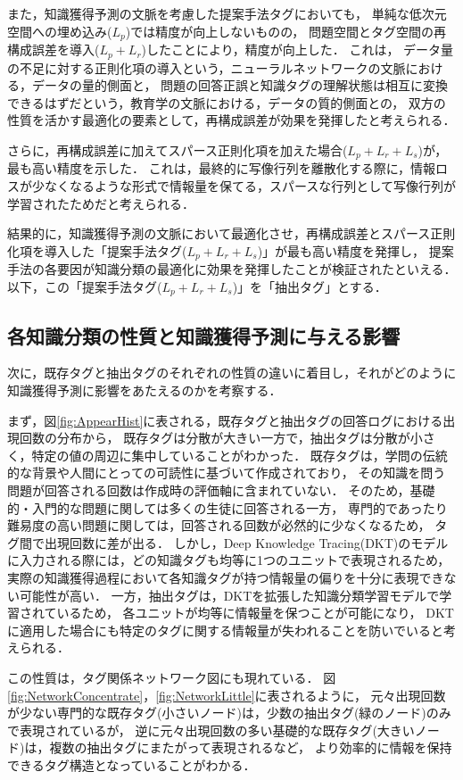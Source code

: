 また，知識獲得予測の文脈を考慮した提案手法タグにおいても，
単純な低次元空間への埋め込み($L_p$)では精度が向上しないものの，
問題空間とタグ空間の再構成誤差を導入($L_p + L_r$)したことにより，精度が向上した．
これは，
データ量の不足に対する正則化項の導入という，ニューラルネットワークの文脈における，データの量的側面と，
問題の回答正誤と知識タグの理解状態は相互に変換できるはずだという，教育学の文脈における，データの質的側面との，
双方の性質を活かす最適化の要素として，再構成誤差が効果を発揮したと考えられる．

さらに，再構成誤差に加えてスパース正則化項を加えた場合($L_p + L_r + L_s$)が，最も高い精度を示した．
これは，最終的に写像行列を離散化する際に，情報ロスが少なくなるような形式で情報量を保てる，スパースな行列として写像行列が学習されたためだと考えられる．

結果的に，知識獲得予測の文脈において最適化させ，再構成誤差とスパース正則化項を導入した「提案手法タグ($L_p + L_r + L_s$)」が最も高い精度を発揮し，
提案手法の各要因が知識分類の最適化に効果を発揮したことが検証されたといえる．
以下，この「提案手法タグ($L_p + L_r + L_s$)」を「抽出タグ」とする．


\subsection{各知識分類の性質と知識獲得予測に与える影響}
次に，既存タグと抽出タグのそれぞれの性質の違いに着目し，それがどのように知識獲得予測に影響をあたえるのかを考察する．

まず，図\ref{fig:AppearHist}に表される，既存タグと抽出タグの回答ログにおける出現回数の分布から，
既存タグは分散が大きい一方で，抽出タグは分散が小さく，特定の値の周辺に集中していることがわかった．
既存タグは，学問の伝統的な背景や人間にとっての可読性に基づいて作成されており，
その知識を問う問題が回答される回数は作成時の評価軸に含まれていない．
そのため，基礎的・入門的な問題に関しては多くの生徒に回答される一方，
専門的であったり難易度の高い問題に関しては，回答される回数が必然的に少なくなるため，
タグ間で出現回数に差が出る．
しかし，Deep Knowledge Tracing(DKT)のモデルに入力される際には，どの知識タグも均等に1つのユニットで表現されるため，
実際の知識獲得過程において各知識タグが持つ情報量の偏りを十分に表現できない可能性が高い．
一方，抽出タグは，DKTを拡張した知識分類学習モデルで学習されているため，
各ユニットが均等に情報量を保つことが可能になり，
DKTに適用した場合にも特定のタグに関する情報量が失われることを防いでいると考えられる．

この性質は，タグ関係ネットワーク図にも現れている．
図\ref{fig:NetworkConcentrate}，\ref{fig:NetworkLittle}に表されるように，
元々出現回数が少ない専門的な既存タグ(小さいノード)は，少数の抽出タグ(緑のノード)のみで表現されているが，
逆に元々出現回数の多い基礎的な既存タグ(大きいノード)は，複数の抽出タグにまたがって表現されるなど，
より効率的に情報を保持できるタグ構造となっていることがわかる．

